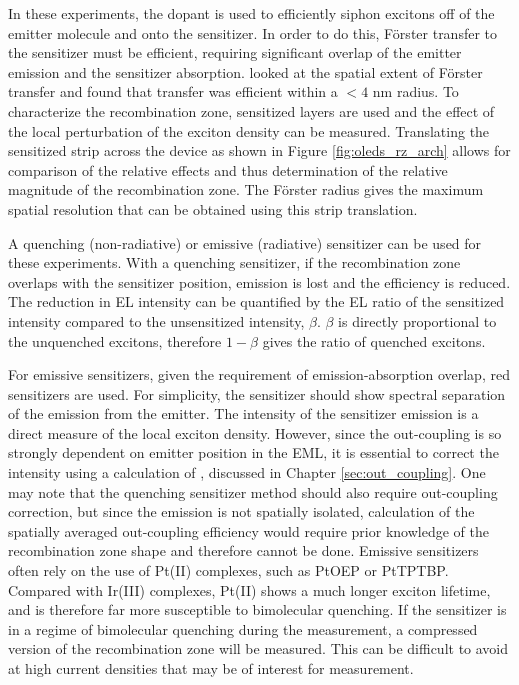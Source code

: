 \documentclass[../thesis.tex]{subfiles}
\begin{document}
In these experiments, the dopant is used to efficiently siphon excitons off of the emitter molecule and onto the sensitizer.
In order to do this, F\"{o}rster transfer to the sensitizer must be efficient, requiring significant overlap of the emitter emission and the sensitizer absorption.
\textcite{Erickson2013a} looked at the spatial extent of F\"{o}rster transfer and found that transfer was efficient within a $<4$ nm radius.
To characterize the recombination zone, sensitized layers are used and the effect of the local perturbation of the exciton density can be measured.
Translating the sensitized strip across the device as shown in Figure \ref{fig:oleds_rz_arch} allows for comparison of the relative effects and thus determination of the relative magnitude of the recombination zone.
The F\"{o}rster radius gives the maximum spatial resolution that can be obtained using this strip translation.

A quenching (non-radiative) or emissive (radiative) sensitizer can be used for these experiments.
With a quenching sensitizer, if the recombination zone overlaps with the sensitizer position, emission is lost and the efficiency is reduced.
The reduction in EL intensity can be quantified by the EL ratio of the sensitized intensity compared to the unsensitized intensity, $\beta$.
$\beta$ is directly proportional to the unquenched excitons, therefore $1-\beta$ gives the ratio of quenched excitons.

For emissive sensitizers, given the requirement of emission-absorption overlap, red sensitizers are used.
For simplicity, the sensitizer should show spectral separation of the emission from the emitter.
The intensity of the sensitizer emission is a direct measure of the local exciton density.
However, since the out-coupling is so strongly dependent on emitter position in the EML, it is essential to correct the intensity using a calculation of \oc, discussed in Chapter \ref{sec:out_coupling}.
One may note that the quenching sensitizer method should also require out-coupling correction, but since the emission is not spatially isolated, calculation of the spatially averaged out-coupling efficiency would require prior knowledge of the recombination zone shape and therefore cannot be done.
Emissive sensitizers often rely on the use of Pt(II) complexes, such as PtOEP or PtTPTBP.\supercite{Coburn2016a,Hershey2017}
Compared with Ir(III) complexes, Pt(II) shows a much longer exciton lifetime, and is therefore far more susceptible to bimolecular quenching.\supercite{Mezyk2005}
If the sensitizer is in a regime of bimolecular quenching during the measurement, a compressed version of the recombination zone will be measured.
This can be difficult to avoid at high current densities that may be of interest for measurement.
\end{document}
